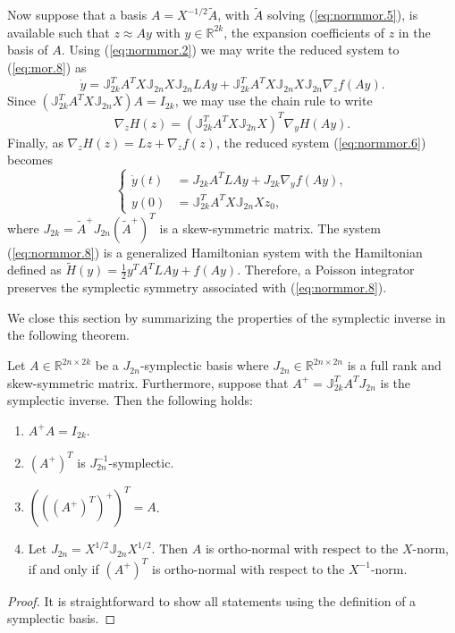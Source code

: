 Now suppose that a basis $A=X^{-1/2}\tilde A$, with $\tilde A$ solving (\ref{eq:normmor.5}), is available such that $z \approx Ay$ with $y\in \mathbb R^{2k}$, the expansion coefficients of $z$ in the basis of $A$. Using (\ref{eq:normmor.2}) we may write the reduced system to (\ref{eq:mor.8}) as
\begin{equation} \label{eq:normmor.6}
	\dot y = \mathbb J_{2k}^T A^T X \mathbb J_{2n} X \mathbb{J}_{2n} LAy + \mathbb J_{2k}^T A^T X \mathbb J_{2n} X \mathbb{J}_{2n} \nabla_z f(Ay).
\end{equation}
Since $(\mathbb J_{2k}^T A^T X \mathbb J_{2n} X) A = I_{2k}$, we may use the chain rule to write
\begin{equation} \label{eq:normmor.7}
	\nabla_z H(z) = ( \mathbb J_{2k}^T A^T X \mathbb J_{2n} X )^T \nabla_y H(Ay).
\end{equation}
Finally, as $\nabla_z H(z) = Lz + \nabla_z f(z)$, the reduced system (\ref{eq:normmor.6}) becomes
\begin{equation} \label{eq:normmor.8}
\left\{
\begin{aligned}
	\dot y(t) &= J_{2k} A^T L A y + J_{2k} \nabla_y f(Ay), \\
	y(0) &= \mathbb J_{2k}^T A^T X \mathbb J_{2n} X z_0,
\end{aligned}
\right.
\end{equation}
where $J_{2k}=\tilde A^+ J_{2n} (\tilde A^+)^T$ is a skew-symmetric matrix. The system (\ref{eq:normmor.8}) is a generalized Hamiltonian system with the Hamiltonian defined as $\tilde H(y) = \frac 1 2 y^TA^TLAy + f(Ay)$. Therefore, a Poisson integrator preserves the symplectic symmetry associated with (\ref{eq:normmor.8}). 

We close this section by summarizing the properties of the symplectic inverse in the following theorem.
\begin{theorem} \label{thm:2}
Let $A\in \mathbb R^{2n\times 2k}$ be a $J_{2n}$-symplectic basis where $J_{2n}\in\mathbb R^{2n\times 2n}$ is a full rank and skew-symmetric matrix. Furthermore, suppose that $A^{+} = \mathbb{J}_{2k}^T A^T J_{2n}$ is the symplectic inverse. Then the following holds:
\begin{enumerate}
\item $A^+A = I_{2k}$.
\item $(A^+)^T$ is $J_{2n}^{-1}$-symplectic.
\item $\left(\left(\left(A^+\right)^T\right)^+\right)^T = A$.
\item Let $J_{2n}=X^{1/2}\mathbb J_{2n} X^{1/2}$. Then $A$ is ortho-normal with respect to the $X$-norm, if and only if $(A^+)^T$ is ortho-normal with respect to the $X^{-1}$-norm.
\end{enumerate}
\end{theorem}
\begin{proof}
It is straightforward to show all statements using the definition of a symplectic basis.
\end{proof}

